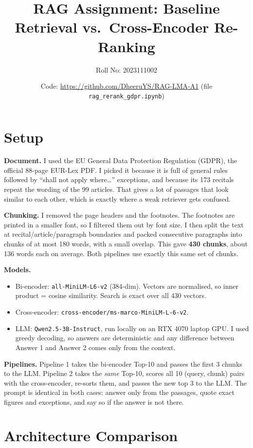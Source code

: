 \documentclass[11pt]{article}
\title{\vspace{-1.5cm}RAG Assignment: Baseline Retrieval vs.\ Cross-Encoder Re-Ranking}
\author{Roll No: 2023111002}
\date{Code: \url{https://github.com/DheeruYS/RAG-LMA-A1} (file \texttt{rag\_rerank\_gdpr.ipynb})}
\begin{document}
\maketitle
\vspace{-0.6cm}

\section{Setup}

\textbf{Document.} I used the EU General Data Protection Regulation (GDPR), the official 88-page EUR-Lex PDF.
I picked it because it is full of general rules followed by ``shall not apply where\ldots'' exceptions,
and because its 173 recitals repeat the wording of the 99 articles. That gives a lot of passages that look
similar to each other, which is exactly where a weak retriever gets confused.

\textbf{Chunking.} I removed the page headers and the footnotes. The footnotes are printed in a smaller font,
so I filtered them out by font size. I then split the text at recital/article/paragraph boundaries and packed
consecutive paragraphs into chunks of at most 180 words, with a small overlap. This gave \textbf{430 chunks},
about 136 words each on average. Both pipelines use exactly this same set of chunks.

\textbf{Models.}
\begin{itemize}
  \item Bi-encoder: \texttt{all-MiniLM-L6-v2} (384-dim). Vectors are normalised, so inner product = cosine similarity. Search is exact over all 430 vectors.
  \item Cross-encoder: \texttt{cross-encoder/ms-marco-MiniLM-L-6-v2}.
  \item LLM: \texttt{Qwen2.5-3B-Instruct}, run locally on an RTX 4070 laptop GPU. I used greedy decoding, so answers are deterministic and any difference between Answer 1 and Answer 2 comes only from the context.
\end{itemize}

\textbf{Pipelines.} Pipeline 1 takes the bi-encoder Top-10 and passes the first 3 chunks to the LLM.
Pipeline 2 takes the \emph{same} Top-10, scores all 10 (query, chunk) pairs with the cross-encoder, re-sorts them,
and passes the new top 3 to the LLM. The prompt is identical in both cases: answer only from the passages, quote exact
figures and exceptions, and say so if the answer is not there.

\section{Architecture Comparison}
\end{document}
